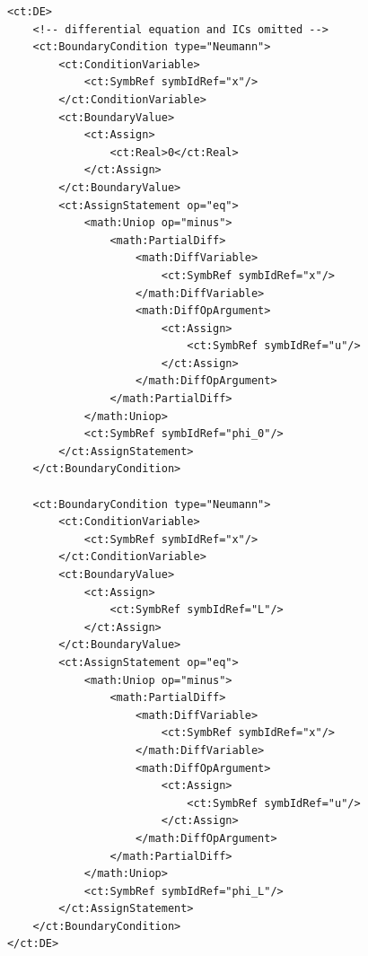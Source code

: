 \lstset{language=XML}
\begin{lstlisting}
            <ct:DE>
                <!-- differential equation and ICs omitted -->
                <ct:BoundaryCondition type="Neumann">
                    <ct:ConditionVariable>
                        <ct:SymbRef symbIdRef="x"/>
                    </ct:ConditionVariable>
                    <ct:BoundaryValue>
                        <ct:Assign>
                            <ct:Real>0</ct:Real>
                        </ct:Assign>
                    </ct:BoundaryValue>
                    <ct:AssignStatement op="eq">
                        <math:Uniop op="minus">
                            <math:PartialDiff>
                                <math:DiffVariable>
                                    <ct:SymbRef symbIdRef="x"/>
                                </math:DiffVariable>
                                <math:DiffOpArgument>
                                    <ct:Assign>
                                        <ct:SymbRef symbIdRef="u"/>
                                    </ct:Assign>
                                </math:DiffOpArgument>
                            </math:PartialDiff>
                        </math:Uniop>
                        <ct:SymbRef symbIdRef="phi_0"/>
                    </ct:AssignStatement>
                </ct:BoundaryCondition>             
                
                <ct:BoundaryCondition type="Neumann">
                    <ct:ConditionVariable>
                        <ct:SymbRef symbIdRef="x"/>
                    </ct:ConditionVariable>
                    <ct:BoundaryValue>
                        <ct:Assign>
                            <ct:SymbRef symbIdRef="L"/>
                        </ct:Assign>
                    </ct:BoundaryValue>
                    <ct:AssignStatement op="eq">
                        <math:Uniop op="minus">
                            <math:PartialDiff>
                                <math:DiffVariable>
                                    <ct:SymbRef symbIdRef="x"/>
                                </math:DiffVariable>
                                <math:DiffOpArgument>
                                    <ct:Assign>
                                        <ct:SymbRef symbIdRef="u"/>
                                    </ct:Assign>
                                </math:DiffOpArgument>
                            </math:PartialDiff>
                        </math:Uniop>
                        <ct:SymbRef symbIdRef="phi_L"/>
                    </ct:AssignStatement>
                </ct:BoundaryCondition>
            </ct:DE>
\end{lstlisting}


